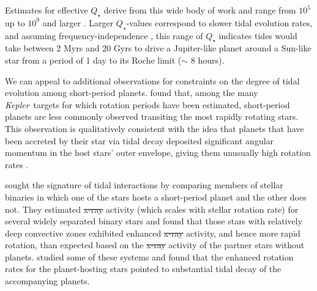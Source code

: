 \documentclass{svjour3}                     %
\newcommand{\kepler}{\emph{Kepler}}
\providecommand{\DIFadd}[1]{{\protect\color{blue}\uwave{#1}}} %
\providecommand{\DIFdel}[1]{{\protect\color{red}\sout{#1}}}                      %
\providecommand{\DIFaddbegin}{} %
\providecommand{\DIFaddend}{} %
\providecommand{\DIFdelbegin}{} %
\providecommand{\DIFdelend}{} %
\begin{document}
Estimates for effective $Q_\star$ derive from this wide body of work and range from $10^5$ \cite{1996Natur.380..606L,2016ApJ...816...18E} up to $10^9$ and larger \cite{2011ApJ...731...67P}. Larger $Q_\star$-values correspond to slower tidal evolution rates, and assuming frequency-independence \cite{1966Icar....5..375G}, this range of $Q_\star$ indicates tides would take between 2 Myrs and 20 Gyrs to drive a Jupiter-like planet around a Sun-like star from a period of 1 day to its Roche limit ($\sim$ 8 hours).

We can appeal to additional observations for constraints on the degree of tidal evolution among short-period planets. \cite{2013ApJ...775L..11M} found that, among the many \kepler\ targets for which rotation periods have been estimated, short-period planets are less commonly observed transiting the most rapidly rotating stars. This observation is qualitatively consistent with the idea that planets that have been accreted by their star via tidal decay deposited significant angular momentum in the host stars' outer envelope, giving them unusually high rotation rates \cite{2009ApJ...698.1357J}. 

\cite{2014A&A...565L...1P} sought the signature of tidal interactions by comparing members of stellar binaries in which one of the stars hosts a short-period planet and the other does not. They estimated \DIFdelbegin \DIFdel{x-ray }\DIFdelend \DIFaddbegin \DIFadd{X-ray }\DIFaddend activity (which scales with stellar rotation rate) for several widely separated binary stars and found that those stars with relatively deep convective zones exhibited enhanced \DIFdelbegin \DIFdel{x-ray }\DIFdelend \DIFaddbegin \DIFadd{X-ray }\DIFaddend activity, and hence more rapid rotation, than expected based on the \DIFdelbegin \DIFdel{x-ray }\DIFdelend \DIFaddbegin \DIFadd{X-ray }\DIFaddend activity of the partner stars without planets. \cite{2015ApJ...807...78F} studied some of these systems and found that the enhanced rotation rates for the planet-hosting stars pointed to substantial tidal decay of the accompanying planets. 
\end{document}
